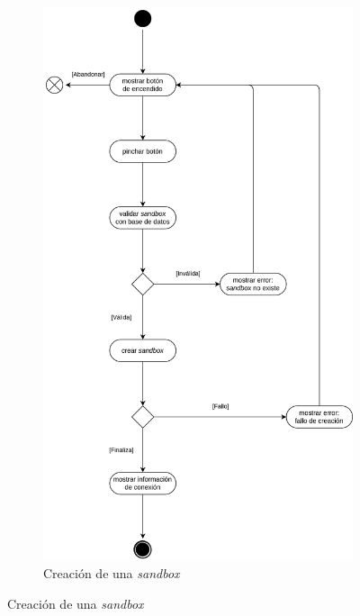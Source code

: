             \begin{figure}[h]
                \centering
                \begin{subfigure}{0.45\textwidth}
                    \centering
                    \includegraphics[scale=0.115]{images/Diagramas/Actividades y transiciones 4.png}
                    \caption{Creación de una \textit{sandbox}}
                    \label{fig:creacion-sandbox}
                \end{subfigure}

\end{figure}

